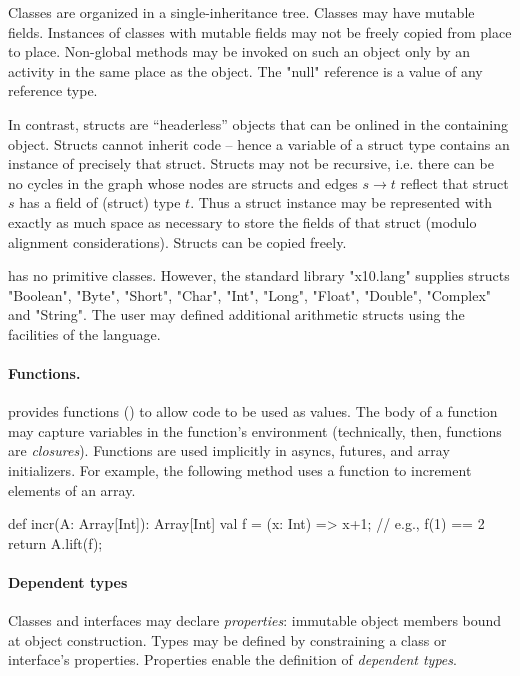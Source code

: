 Classes are organized in a single-inheritance tree. Classes may have
mutable fields.  Instances of classes with mutable fields may not be
freely copied from place to place. Non-global methods may be invoked
on such an object only by an activity in the same place as the object.
The \xcd"null" reference is a value of any reference type.

In contrast, structs are ``headerless'' objects that can be onlined in
the containing object.  Structs cannot inherit code -- hence a
variable of a struct type contains an instance of precisely that
struct. Structs may not be recursive, i.e.{} there can be no cycles in
the graph whose nodes are structs and edges $s \rightarrow t$ reflect
that struct $s$ has a field of (struct) type $t$. Thus a struct
instance may be represented with exactly as much space as necessary to
store the fields of that struct (modulo alignment considerations). Structs
can be copied freely. 

\Xten{} has no primitive classes. However, the standard library
\xcd"x10.lang" supplies structs \xcd"Boolean", \xcd"Byte",
\xcd"Short", \xcd"Char", \xcd"Int", \xcd"Long", \xcd"Float",
\xcd"Double", \xcd"Complex" and \xcd"String". The user may defined
additional arithmetic structs using the facilities of the
language.

\paragraph{Functions.}
\Xten{} provides functions () to allow code to be used
as values.  The body of a function may capture variables in the
function's environment (technically, then, functions are {\em
  closures}).  Functions are used implicitly in asyncs, futures, and
array initializers.
%
For example, the following method uses a function to increment
elements of an array.
\begin{xten}
def incr(A: Array[Int]): Array[Int] {
    val f = (x: Int) => x+1; // e.g., f(1) == 2
    return A.lift(f);
}
\end{xten}

\paragraph{Dependent types}
Classes and interfaces may declare \emph{properties}: immutable object members bound at object construction.
Types may be defined by constraining a
class or interface's properties.
Properties enable the definition of \emph{dependent types}.

